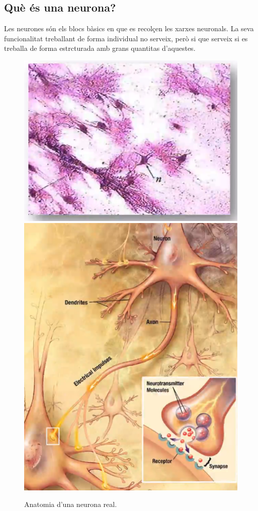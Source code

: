 \documentclass[12pt]{article}
\begin{document}
\clearpage
\subsection{Què és una neurona?}
Les neurones són els blocs bàsics en que es recolçen les xarxes neuronals. La seva funcionalitat treballant de forma individual no serveix, però si que serveix si es treballa de forma estrcturada amb grans quantitas d'aquestes.
\begin{figure}[h!]
	\centering
	\includegraphics[scale=0.4]{imatges/neurona/1real.png}
	\includegraphics[scale=0.4]{imatges/neurona/3estructura.png}
	\caption{Anatomia d'una neurona real.}
\end{figure}
\end{document}
